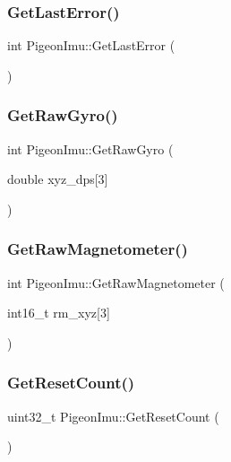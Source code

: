\subsubsection{\texorpdfstring{Get\+Last\+Error()}{GetLastError()}}
{\footnotesize\ttfamily int Pigeon\+Imu\+::\+Get\+Last\+Error (\begin{DoxyParamCaption}{ }\end{DoxyParamCaption})}

\mbox{\label{class_pigeon_imu_a2b55d63b3aedea9a9adb4a407e590b8b}} 
\subsubsection{\texorpdfstring{Get\+Raw\+Gyro()}{GetRawGyro()}}
{\footnotesize\ttfamily int Pigeon\+Imu\+::\+Get\+Raw\+Gyro (\begin{DoxyParamCaption}\item[{double}]{xyz\+\_\+dps\mbox{[}3\mbox{]} }\end{DoxyParamCaption})}

\mbox{\label{class_pigeon_imu_a32d122b8d60a864feaac7e755ab7b70b}} 
\subsubsection{\texorpdfstring{Get\+Raw\+Magnetometer()}{GetRawMagnetometer()}}
{\footnotesize\ttfamily int Pigeon\+Imu\+::\+Get\+Raw\+Magnetometer (\begin{DoxyParamCaption}\item[{int16\+\_\+t}]{rm\+\_\+xyz\mbox{[}3\mbox{]} }\end{DoxyParamCaption})}

\mbox{\label{class_pigeon_imu_abf5fe406769d034b5e58ffb8d1438b4e}} 
\subsubsection{\texorpdfstring{Get\+Reset\+Count()}{GetResetCount()}}
{\footnotesize\ttfamily uint32\+\_\+t Pigeon\+Imu\+::\+Get\+Reset\+Count (\begin{DoxyParamCaption}{ }\end{DoxyParamCaption})}

